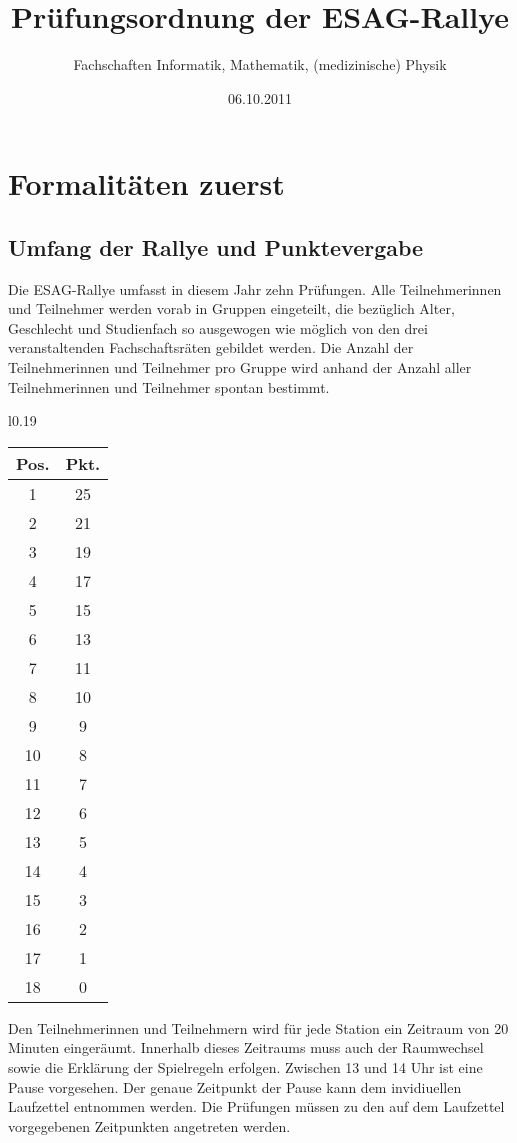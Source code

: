 \documentclass[a4paper,10pt]{article}
\title{Prüfungsordnung der ESAG-Rallye}
\author{Fachschaften Informatik, Mathematik, (medizinische) Physik}
\date{06.10.2011}
\begin{document}
\pagestyle{plain}
\maketitle
\tableofcontents

\newpage
\pagestyle{plain}
\section[Formalitäten]{Formalitäten zuerst}

\subsection{Umfang der Rallye und Punktevergabe}

Die ESAG-Rallye umfasst in diesem Jahr zehn Prüfungen. Alle Teilnehmerinnen 
und Teilnehmer werden vorab in Gruppen eingeteilt, die bezüglich Alter, Geschlecht und
Studienfach so ausgewogen wie möglich von den drei veranstaltenden
Fachschaftsräten gebildet werden. Die Anzahl der Teilnehmerinnen und Teilnehmer pro Gruppe
wird anhand der Anzahl aller Teilnehmerinnen und Teilnehmer spontan bestimmt.

\begin{wrapfigure}{l}{0.19\textwidth}
\begin{tabular}{c|c}
\textbf{Pos.} & \textbf{Pkt.} \\
\hline
1 & 25\\
2 & 21 \\
3 & 19 \\
4 & 17 \\
5 & 15 \\
6 & 13 \\
7 & 11 \\
8 & 10 \\
9 & 9 \\
10 &8 \\
11 & 7 \\
12 & 6 \\
13 & 5 \\
14 & 4 \\
15 & 3\\
16 & 2\\
17 & 1\\
18 & 0 
\end{tabular}
\vspace{15pt}
\end{wrapfigure}

Den Teilnehmerinnen und Teilnehmern wird für jede Station ein Zeitraum 
von 20 Minuten eingeräumt. Innerhalb dieses Zeitraums muss auch der 
Raumwechsel sowie die Erklärung der Spielregeln erfolgen. Zwischen 
13 und 14 Uhr ist eine Pause vorgesehen. Der genaue Zeitpunkt der Pause 
kann dem invidiuellen Laufzettel entnommen werden. Die Prüfungen müssen 
zu den auf dem Laufzettel vorgegebenen Zeitpunkten angetreten werden.
\end{document}

